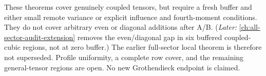 These theorems cover genuinely coupled tensors, but require a fresh
buffer and either small remote variance or explicit influence and
fourth-moment conditions. They do not cover arbitrary even or
diagonal additions after A/B. (\emph{Later:} \autoref{ch:all-sector-audit-extension} removes the even/diagonal gap in six buffered coupled-cubic regions, not at zero buffer.) The earlier full-sector local theorem
is therefore not superseded. Profile uniformity, a complete row
cover, and the remaining general-tensor regions are open. No new
Grothendieck endpoint is claimed.
